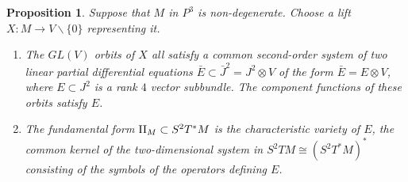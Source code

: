 \documentclass[11pt]{article}
\numberwithin{equation}{section}
\newcounter{count}
\theoremstyle{plain}
\newtheorem{proposition}[count]{Proposition}
\theoremstyle{remark}
\newcommand{\GL}{GL}
\newcommand{\II}{\textnormal{II}}
\begin{document}
\begin{proposition}\label{findingE} Suppose that $M$ in $P^{3}$ is non-degenerate. Choose a lift $X:M\rightarrow  V \backslash \{0\}$ representing it.
\begin{enumerate}
\item{\label{constructEbarE}The $\GL(V)$ orbits of $X$ all satisfy a common second-order system of two linear partial differential equations $\bar{E}\subset \bar{J}^{2}=J^{2}\otimes V$ of the form $\bar{E}=E\otimes V$, where $E\subset J^{2}$ is a rank $4$ vector subbundle. The component functions of these orbits satisfy $E$.}
\item{\label{charvar}The fundamental form $\II_M\subset S^{2}T^{*}M$ is the characteristic variety of $E$, the common kernel of the two-dimensional system in $S^{2}TM\cong (S^{2}T^{*}M)^{*}$ consisting of the symbols of the operators defining $E$.}
\end{enumerate}
\end{proposition}
\end{document}
